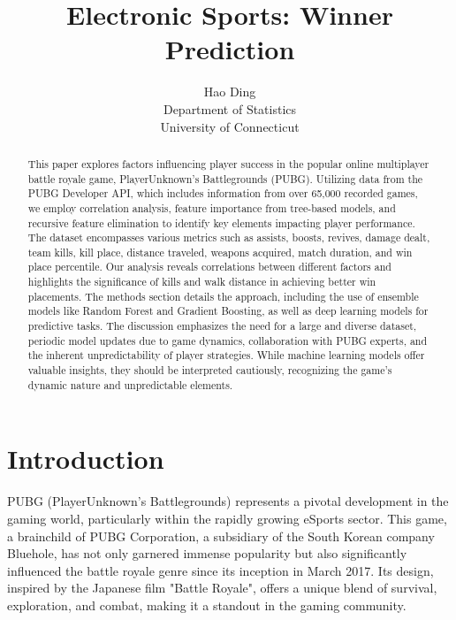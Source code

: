 \documentclass[12pt]{article}
\title{Electronic Sports: Winner Prediction}
\author{Hao Ding\\
  Department of Statistics\\
  University of Connecticut
}
\begin{document}
\maketitle

\doublespacing

\begin{abstract}
	
This paper explores factors influencing player success in the popular online multiplayer battle royale game, PlayerUnknown's Battlegrounds (PUBG). Utilizing data from the PUBG Developer API, which includes information from over 65,000 recorded games, we employ correlation analysis, feature importance from tree-based models, and recursive feature elimination to identify key elements impacting player performance. The dataset encompasses various metrics such as assists, boosts, revives, damage dealt, team kills, kill place, distance traveled, weapons acquired, match duration, and win place percentile. Our analysis reveals correlations between different factors and highlights the significance of kills and walk distance in achieving better win placements. The methods section details the approach, including the use of ensemble models like Random Forest and Gradient Boosting, as well as deep learning models for predictive tasks. The discussion emphasizes the need for a large and diverse dataset, periodic model updates due to game dynamics, collaboration with PUBG experts, and the inherent unpredictability of player strategies. While machine learning models offer valuable insights, they should be interpreted cautiously, recognizing the game's dynamic nature and unpredictable elements.  

\end{abstract}


\section{Introduction}
\label{sec:intro}

PUBG (PlayerUnknown's Battlegrounds) represents a pivotal development in the gaming world, particularly within the rapidly growing eSports sector. This game, a brainchild of PUBG Corporation, a subsidiary of the South Korean company Bluehole, has not only garnered immense popularity but also significantly influenced the battle royale genre since its inception in March 2017. Its design, inspired by the Japanese film "Battle Royale", offers a unique blend of survival, exploration, and combat, making it a standout in the gaming community.
\end{document}
